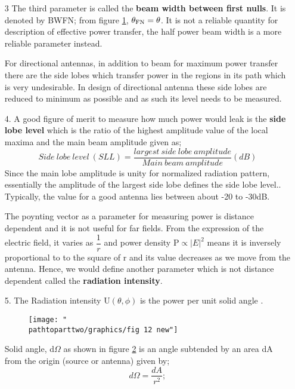 \begin{enumerate}
Also there is a third parameter which answers to the question of what is the effective angle over which the radiation goes? If we accept the variations of electric fields within the sector but provided radiation does not go to zero, the choice would be the first nulls on either sides of the main beam and then the beam width would be $\theta$ from figure\ref{figure11}

\begin{figure}[h]
\centering
\texttt{[image: "\\pathtoparttwo/graphics/fig 11 new"]}
\label{figure11}
\end{figure}
\item[3]The third parameter is called the \textbf{beam width between first nulls}. It is denoted by BWFN; from figure \ref{figure11}, $\theta_{\textnormal{FN}}=\theta$. It is not a reliable quantity for description of effective power transfer, the half power beam width is a more reliable parameter instead.

For directional antennas, in addition to beam for maximum power transfer there are the side lobes which transfer power in the regions in its path which is very undesirable. In design of directional antenna these side lobes are reduced to minimum as possible and as such its level needs to be measured.
\item[4.]A good figure of merit to measure how much power would leak is the \textbf{side lobe level} which is the ratio of the highest amplitude value of the local maxima and the main beam amplitude given as;
$$ Side\ lobe\ level\ (SLL)=\frac{largest\ side\ lobe\ amplitude}{Main\ beam\ amplitude}(dB)$$
Since the main lobe amplitude is unity for normalized radiation pattern, essentially the amplitude of the largest side lobe defines the side lobe level.. Typically, the value for a good antenna lies between about -20 to -30dB.

The poynting vector as a parameter for measuring power is distance dependent and it is not useful for far fields. From the expression of the electric field, it varies as $\dfrac{1}{r}$ and power density P$\propto |E|^{2}$ means it is inversely proportional to to the square of  r and its value decreases as we move from the antenna. Hence, we would define another parameter which is not distance dependent called the \textbf{radiation intensity}.
\item[5.] The Radiation intensity U$(\theta, \phi)$ is the power per unit solid angle .

\begin{figure}[h]
\centering
\texttt{[image: "\\pathtoparttwo/graphics/fig 12 new"]}
\label{figure12}
\end{figure}
Solid angle, d$\Omega$ as shown in figure \ref{figure12} is an angle subtended by an area dA from the origin (source or antenna) given by;$$d\Omega=\frac{dA}{r^{2}};$$


\end{enumerate}
